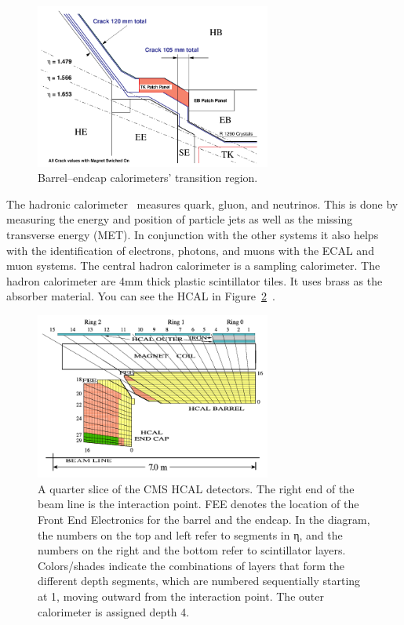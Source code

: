 \begin{figure}[htb]
\centering
\includegraphics[width=0.69\textwidth]{Experiment/ECAL_TDR_crack.pdf}
\caption{Barrel–endcap calorimeters’ transition region.~\cite{ECAL_report}}
\label{fig:CMS_ecal_crack}
\end{figure}

The hadronic calorimeter~\cite{HCAL_report} measures quark, gluon, and neutrinos.  This is done by measuring the energy and position of particle jets as well as the missing transverse energy (MET).  In conjunction with the other systems it also helps with the identification of electrons, photons, and muons with the ECAL and muon systems.  The central hadron calorimeter is a sampling calorimeter. The hadron calorimeter are 4mm thick plastic scintillator tiles. It uses brass as the absorber material. You can see the HCAL in Figure~\ref{fig:CMS_hcal}~\cite{Chatrchyan:2009hw}.

\begin{figure}[htb]
\centering
\includegraphics[width=0.69\textwidth]{Experiment/fig_HCALdiagram.png}
\caption{A quarter slice of the CMS HCAL detectors. The right end of the beam line is the interaction point. FEE denotes the location of the Front End Electronics for the barrel and the endcap. In the diagram, the numbers on the top and left refer to segments in η, and the numbers on the right and the bottom refer to scintillator layers. Colors/shades indicate the combinations of layers that form the different depth segments, which are numbered sequentially starting at 1, moving outward from the interaction point. The outer calorimeter is assigned depth 4.~\cite{Chatrchyan:2009hw}}
\label{fig:CMS_hcal}
\end{figure}


